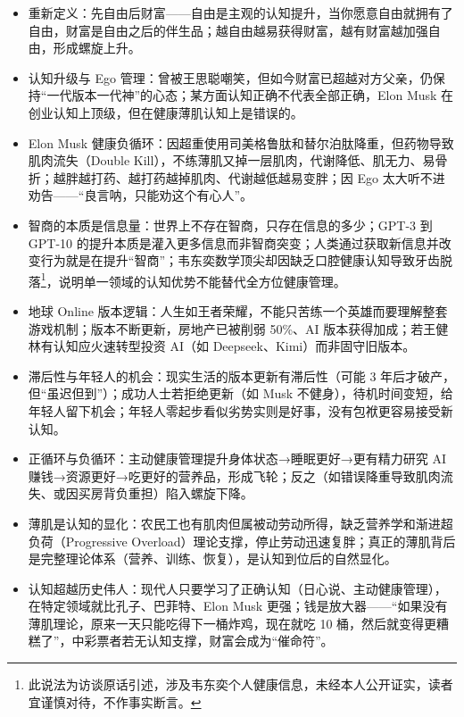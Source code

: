 \begin{itemize}
\tightlist
\item
  重新定义：先自由后财富------自由是主观的认知提升，当你愿意自由就拥有了自由，财富是自由之后的伴生品；越自由越易获得财富，越有财富越加强自由，形成螺旋上升。
\item
  认知升级与 Ego
  管理：曾被王思聪嘲笑，但如今财富已超越对方父亲，仍保持``一代版本一代神''的心态；某方面认知正确不代表全部正确，Elon
  Musk 在创业认知上顶级，但在健康薄肌认知上是错误的。
\item
  Elon Musk
  健康负循环：因超重使用司美格鲁肽和替尔泊肽降重，但药物导致肌肉流失（Double
  Kill），不练薄肌又掉一层肌肉，代谢降低、肌无力、易骨折；越胖越打药、越打药越掉肌肉、代谢越低越易变胖；因
  Ego 太大听不进劝告------``良言呐，只能劝这个有心人''。
\item
  智商的本质是信息量：世界上不存在智商，只存在信息的多少；GPT-3 到
  GPT-10
  的提升本质是灌入更多信息而非智商突变；人类通过获取新信息并改变行为就是在提升``智商''；韦东奕数学顶尖却因缺乏口腔健康认知导致牙齿脱落\footnote{此说法为访谈原话引述，涉及韦东奕个人健康信息，未经本人公开证实，读者宜谨慎对待，不作事实断言。}，说明单一领域的认知优势不能替代全方位健康管理。
\item
  地球 Online
  版本逻辑：人生如王者荣耀，不能只苦练一个英雄而要理解整套游戏机制；版本不断更新，房地产已被削弱
  50\%、AI 版本获得加成；若王健林有认知应火速转型投资 AI（如
  Deepseek、Kimi）而非固守旧版本。
\item
  滞后性与年轻人的机会：现实生活的版本更新有滞后性（可能 3
  年后才破产，但``虽迟但到''）；成功人士若拒绝更新（如 Musk
  不健身），待机时间变短，给年轻人留下机会；年轻人零起步看似劣势实则是好事，没有包袱更容易接受新认知。
\item
  正循环与负循环：主动健康管理提升身体状态→睡眠更好→更有精力研究 AI
  赚钱→资源更好→吃更好的营养品，形成飞轮；反之（如错误降重导致肌肉流失、或因买房背负重担）陷入螺旋下降。
\item
  薄肌是认知的显化：农民工也有肌肉但属被动劳动所得，缺乏营养学和渐进超负荷（Progressive
  Overload）理论支撑，停止劳动迅速复胖；真正的薄肌背后是完整理论体系（营养、训练、恢复），是认知到位后的自然显化。
\item
  认知超越历史伟人：现代人只要学习了正确认知（日心说、主动健康管理），在特定领域就比孔子、巴菲特、Elon
  Musk
  更强；钱是放大器------``如果没有薄肌理论，原来一天只能吃得下一桶炸鸡，现在就吃
  10
  桶，然后就变得更糟糕了''，中彩票者若无认知支撑，财富会成为``催命符''。
\end{itemize}

